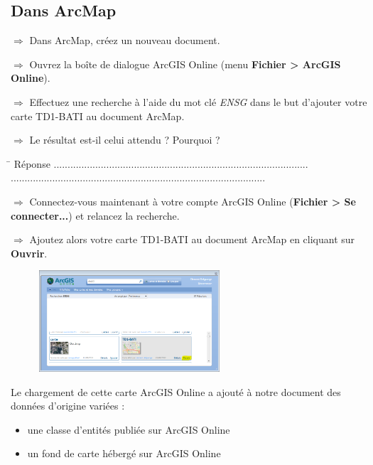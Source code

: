 \documentclass[11pt]{article}
\newcommand{\action}{$\Rightarrow$ }
\newcommand{\reponse}{
	\begin{tabbing}
	\hspace{2cm}\=\kill
	Réponse \> ............................................................................................ \\ 
 	\> ............................................................................................
	\end{tabbing}
}
\begin{document}
\subsection{Dans ArcMap}
\action Dans ArcMap, créez un nouveau document.

\action Ouvrez la  boîte de dialogue ArcGIS Online (menu \textbf{Fichier > ArcGIS Online}).

\action Effectuez une recherche à l'aide du mot clé \textit{ENSG} dans le but d'ajouter votre carte TD1-BATI au document ArcMap. 

\action Le résultat est-il celui attendu ? Pourquoi ?

\reponse

\action Connectez-vous maintenant à votre compte ArcGIS Online (\textbf{Fichier > Se connecter...}) et relancez la recherche. 

\action Ajoutez alors votre carte TD1-BATI au document ArcMap en cliquant sur \textbf{Ouvrir}.
\begin{figure}[H]
	\center \includegraphics[width=0.6\textwidth]{img/td1/am_ouvrir_service_ago.png} \\
\end{figure}

Le chargement de cette carte ArcGIS Online a ajouté à notre document des données d'origine variées :
\begin{itemize}
	\item une classe d'entités publiée sur ArcGIS Online
	\item un fond de carte hébergé sur ArcGIS Online
\end{itemize}

%
%
%
%
%
%
%
%
\end{document}
